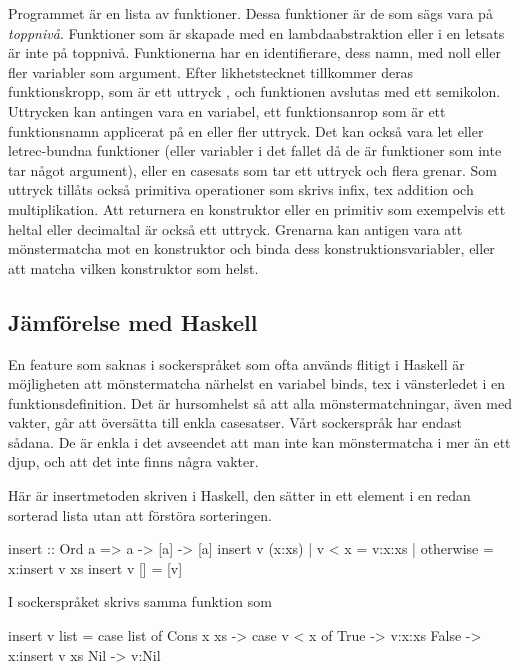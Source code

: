 \documentclass[Rapport]{subfiles}
\begin{document}
Programmet är en lista av funktioner. Dessa funktioner är de som sägs vara på
\emph{toppnivå}. Funktioner som är skapade med en lambdaabstraktion eller i en
letsats är inte på toppnivå. 
  Funktionerna har en identifierare, dess namn, med noll eller fler variabler som argument. Efter likhetstecknet
tillkommer deras funktionskropp, som är ett uttryck , och funktionen avslutas med
ett semikolon.
    Uttrycken kan antingen vara en variabel, ett funktionsanrop som är ett
funktionsnamn applicerat på en eller fler uttryck. Det kan också vara let eller
letrec-bundna funktioner (eller variabler i det fallet då de är funktioner som
inte tar något argument), eller en casesats som tar ett uttryck och flera grenar.
Som uttryck tillåts också primitiva operationer som skrivs infix, tex addition 
och multiplikation. Att returnera en konstruktor eller en primitiv som 
exempelvis ett heltal eller decimaltal är också ett uttryck.
    Grenarna kan antigen vara att mönstermatcha mot en konstruktor och binda
dess konstruktionsvariabler, eller att matcha vilken konstruktor som helst.


\subsection{Jämförelse med Haskell}

    En feature som saknas i sockerspråket som ofta används flitigt i Haskell är 
möjligheten att mönstermatcha närhelst en variabel binds, tex i vänsterledet
i en funktionsdefinition. Det är hursomhelst så att alla mönstermatchningar,
även med vakter, går att översätta till enkla casesatser. Vårt sockerspråk
har endast sådana. De är enkla i det avseendet att man inte kan mönstermatcha i 
mer än ett djup, och att det inte finns några vakter.

Här är insertmetoden skriven i Haskell, den sätter in ett element i en redan sorterad
lista utan att förstöra sorteringen.

\begin{codeEx}
  insert :: Ord a => a -> [a] -> [a]
  insert v (x:xs) 
      | v < x     = v:x:xs
      | otherwise = x:insert v xs 
  insert v [] = [v]
\end{codeEx}                  

I sockerspråket skrivs samma funktion som

\begin{codeEx}
  insert v list = case list of
      Cons x xs -> case v < x of
          True  -> v:x:xs
          False -> x:insert v xs
      Nil -> v:Nil
\end{codeEx}
\end{document}
